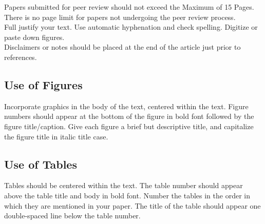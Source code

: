 \documentclass[letterpaper,times]{IONconf}
\begin{document}
Papers submitted for peer review should not exceed the Maximum of 15 Pages. There is no page limit for papers not undergoing the peer review process.\\
Full justify your text. Use automatic hyphenation and check spelling. Digitize or paste down figures.\\
Disclaimers or notes should be placed at the end of the article just prior to references.

\subsection{Use of Figures}

Incorporate graphics in the body of the text, centered within the text. Figure numbers should appear at the bottom of the figure in bold font followed by the figure title/caption. Give each figure a brief but descriptive title, and capitalize the figure title in italic title case.


\subsection{Use of Tables}

Tables should be centered within the text. The table number should appear above the table title and body in bold font. Number the tables in the order in which they are mentioned in your paper. The title of the table should appear one double-spaced line below the table number.


\end{document}
